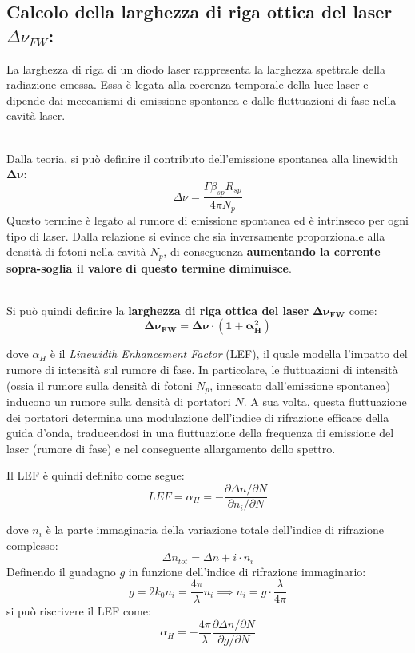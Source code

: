 \subsection{Calcolo della larghezza di riga ottica del laser $\Delta\nu_{FW}$:}
La larghezza di riga di un diodo laser rappresenta la larghezza spettrale della radiazione emessa. Essa è legata alla coerenza temporale della luce laser e dipende dai
meccanismi di emissione spontanea e dalle fluttuazioni di fase nella cavità laser.

\noindent\\ Dalla teoria, si può definire il contributo dell'emissione spontanea alla linewidth $\boldsymbol{\Delta\nu}$:
\begin{equation}
\Delta\nu = \frac{\Gamma \beta_{sp} R_{sp}}{4\pi N_p}
\end{equation}
\noindent Questo termine è legato al rumore di emissione spontanea ed è intrinseco per ogni tipo di laser. Dalla relazione si evince che sia inversamente proporzionale alla
densità di fotoni nella cavità $N_p$, di conseguenza \textbf{aumentando la corrente sopra-soglia il valore di questo termine diminuisce}.

\noindent\\ Si può quindi definire la \textbf{larghezza di riga ottica del laser} $\boldsymbol{\Delta\nu_{FW}}$ come:
\begin{equation}
\boldsymbol{\Delta\nu_{FW} = \Delta\nu \cdot (1 + \alpha_H^2)}
\end{equation}

\noindent dove $\alpha_H$ è il \textit{Linewidth Enhancement Factor} (LEF), il quale modella l'impatto del rumore di intensità sul rumore di fase. In particolare, le
fluttuazioni di intensità (ossia il rumore sulla densità di fotoni $N_p$, innescato dall'emissione spontanea) inducono un rumore sulla densità di portatori $N$. A sua volta,
questa fluttuazione dei portatori determina una modulazione dell'indice di rifrazione efficace della guida d'onda, traducendosi in una fluttuazione della frequenza di
emissione del laser (rumore di fase) e nel conseguente allargamento dello spettro.

\noindent Il LEF è quindi definito come segue:
\begin{equation}
    LEF = \alpha_H = - \frac{\partial \Delta n / \partial N}{\partial n_i / \partial N}
\end{equation}

\noindent dove $n_i$ è la parte immaginaria della variazione totale dell'indice di rifrazione complesso:
\[
\Delta n_{tot} = \Delta n + i\cdot n_i
\]
\noindent Definendo il guadagno $g$ in funzione dell'indice di rifrazione immaginario:
\[
    g = 2 k_0 n_i = \frac{4 \pi}{\lambda} n_i \implies n_i = g \cdot \frac{\lambda}{4 \pi}
\]
si può riscrivere il LEF come:
\begin{equation}
    \alpha_H = - \frac{4 \pi}{\lambda} \frac{\partial \Delta n / \partial N}{\partial g / \partial N}
\end{equation}

